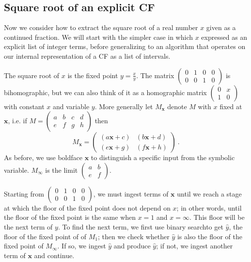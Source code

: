\documentclass[11pt, oneside]{amsart}   	%
\newcommand{\abcd}{\left(
\begin{smallmatrix} 
a & b & c & d\\ 
e & f & g & h
\end{smallmatrix}
\right)}
\begin{document}
\subsection{Square root of an explicit CF}
Now we consider how to extract the square root of a real number $x$ given as a continued fraction. We will start 
with the simpler case in which $x$ expressed as an explicit list of integer terms, before generalizing to an algorithm that
operates on our internal representation of a CF as a list of intervals.

The square root of $x$ is the fixed point $y = \frac{x}{y}$. The matrix $\left(
\begin{smallmatrix} 
0 & 1 & 0 & 0\\ 
0 & 0 & 1 & 0
\end{smallmatrix}
\right)$
is bihomographic, but we can also think of it as a homographic
matrix $\left(
\begin{smallmatrix} 
0 & x \\ 
1 & 0 
\end{smallmatrix}
\right)$ with constant $x$ and variable $y$. More generally let $M_{\mathbf{x}}$ denote $M$ with $x$ fixed at $\mathbf{x}$,
i.e. if $M=\abcd$ then
\[
M_{\mathbf{x}} = \begin{pmatrix}
                                (a\mathbf{x}+c) & (b\mathbf{x}+d)\\
                                (e\mathbf{x}+g) & (f\mathbf{x}+h)
                                \end{pmatrix}\ .
\]
As before, we use boldface $\mathbf{x}$ to distinguish a specific input from the symbolic variable. $M_{\infty}$ is the limit $\left(
\begin{smallmatrix} 
a & b \\ 
e & f 
\end{smallmatrix}
\right)$.

Starting from $\left(
\begin{smallmatrix} 
0 & 1 & 0 & 0\\ 
0 & 0 & 1 & 0
\end{smallmatrix}
\right)$, we must ingest terms of $\mathbf{x}$ until we reach a stage at which the floor of the fixed point does not depend on $x$;
in other words, until the floor of the fixed point is the same when $x=1$ and $x=\infty$. This floor will be the next term of $y$.
To find the next term, we first use binary searchto get $\hat{y}$, the floor of the fixed point of of $M_1$; 
then we check whether $\hat{y}$ is also the floor of the fixed point of  $M_{\infty}$. If so, we ingest
$\hat{y}$ and produce $\hat{y}$; if not, we ingest another term of $\mathbf{x}$ and continue.
\end{document}
